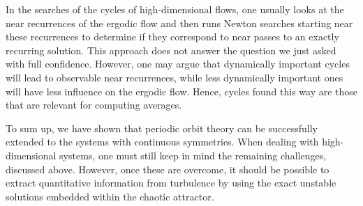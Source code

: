 In the searches of the cycles of high-dimensional flows, one usually looks at
the near recurrences of the ergodic flow and then runs Newton searches
starting near these recurrences to determine if they correspond to near passes
to an exactly recurring solution. This approach does not answer the question 
we just asked with full confidence. However, one may argue that dynamically 
important cycles will lead to observable near recurrences, while less
dynamically important ones will have less influence on the ergodic flow. Hence, 
cycles found this way are those that are relevant for computing averages.

To sum up, we have shown that periodic orbit theory can be successfully extended to
the systems with continuous symmetries. When dealing with high-dimensional systems,
one must still keep in mind the remaining challenges, discussed above. However, once 
these are overcome, it should be possible to extract quantitative information 
from turbulence by using the exact unstable solutions embedded within the chaotic 
attractor.